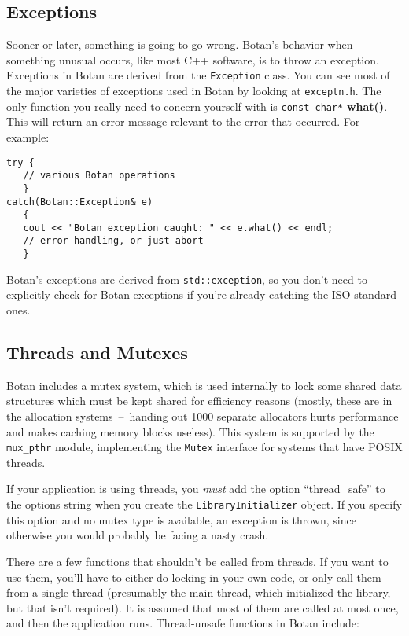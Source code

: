 \documentclass{article}
\newcommand{\filename}[1]{\texttt{#1}}
\newcommand{\function}[1]{\textbf{#1}}
\newcommand{\type}[1]{\texttt{#1}}
\begin{document}
\subsection{Exceptions}

Sooner or later, something is going to go wrong. Botan's behavior when
something unusual occurs, like most C++ software, is to throw an exception.
Exceptions in Botan are derived from the \type{Exception} class. You can see
most of the major varieties of exceptions used in Botan by looking at
\filename{exceptn.h}. The only function you really need to concern yourself
with is \type{const char*} \function{what()}. This will return an error message
relevant to the error that occurred. For example:

\begin{verbatim}
try {
   // various Botan operations
   }
catch(Botan::Exception& e)
   {
   cout << "Botan exception caught: " << e.what() << endl;
   // error handling, or just abort
   }
\end{verbatim}

Botan's exceptions are derived from \type{std::exception}, so you don't need
to explicitly check for Botan exceptions if you're already catching the ISO
standard ones.

\subsection{Threads and Mutexes}

Botan includes a mutex system, which is used internally to lock some shared
data structures which must be kept shared for efficiency reasons (mostly, these
are in the allocation systems~--~handing out 1000 separate allocators hurts
performance and makes caching memory blocks useless). This system is supported
by the \texttt{mux\_pthr} module, implementing the \type{Mutex} interface for
systems that have POSIX threads.

If your application is using threads, you \emph{must} add the option
``thread\_safe'' to the options string when you create the
\type{LibraryInitializer} object. If you specify this option and no mutex type
is available, an exception is thrown, since otherwise you would probably be
facing a nasty crash.

There are a few functions that shouldn't be called from threads. If you want to
use them, you'll have to either do locking in your own code, or only call them
from a single thread (presumably the main thread, which initialized the
library, but that isn't required). It is assumed that most of them are called
at most once, and then the application runs. Thread-unsafe functions in Botan
include:
\end{document}
